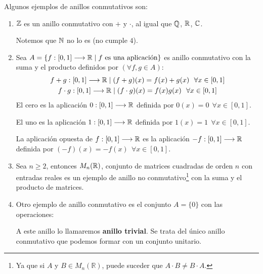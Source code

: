 \begin{ejemplo}
    Algunos ejemplos de anillos conmutativos son:
    \begin{enumerate}
        \item $\mathbb Z$ es un anillo conmutativo con $+$ y $\cdot$, al igual que $\mathbb Q$, $\mathbb R$, $\mathbb C$.
        
        Notemos que $\mathbb N$ no lo es (no cumple $4$).

        \item Sea $A = \{f:[0,1] \longrightarrow \mathbb R \mid f \mbox{ es una aplicación}\}$ es anillo conmutativo con la suma y el producto definidos por $(\forall f,g \in A)$:
        \begin{gather*}
            f+g:[0,1] \longrightarrow \mathbb R \mid (f+g)(x) = f(x) + g(x)~~\forall x \in [0,1] \\
            f\cdot g:[0,1] \longrightarrow \mathbb R \mid (f\cdot g)(x) = f(x) g(x)~~\forall x \in [0,1]
        \end{gather*}
        El cero es la aplicación $0:[0,1] \longrightarrow \mathbb R$ definida por $0(x) = 0~~\forall x \in [0,1]$.
        
        El uno es la aplicación $1:[0,1] \longrightarrow \mathbb R$ definida por $1(x) = 1~~\forall x \in [0,1]$.
        
        La aplicación opuesta de $f:[0,1] \longrightarrow \mathbb R$ es la aplicación $-f:[0,1]\longrightarrow \mathbb R$ definida por $(-f)(x) = -f(x)~~ \forall x \in [0,1]$.

    \item Sea $n \geq 2$, entonces $M_n(\mathbb R)$, conjunto de matrices cuadradas de orden $n$ con entradas reales es un ejemplo de anillo no conmutativo\footnote{Ya que si $A$ y $B\in M_n(\mathbb{R})$, puede suceder que $A\cdot B\neq B\cdot A$.} con la suma y el producto de matrices.

        \item Otro ejemplo de anillo conmutativo es el conjunto $A = \{0\}$ con las operaciones:
        
        A este anillo lo llamaremos \textbf{anillo trivial}. Se trata del único anillo conmutativo que podemos formar con un conjunto unitario.
    \end{enumerate}
\end{ejemplo}

